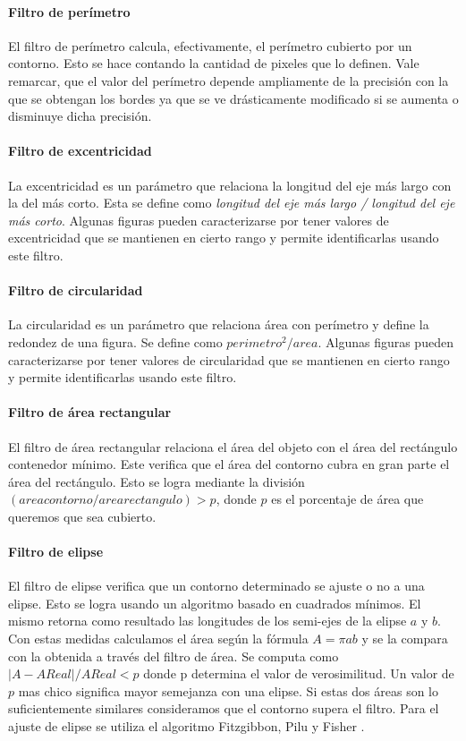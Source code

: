 	\paragraph{Filtro de per\'imetro}
	El filtro de per\'imetro calcula, efectivamente, el per\'imetro 
	cubierto por un contorno. Esto se hace contando la cantidad de pixeles que lo definen.
	Vale remarcar, que el valor del per\'imetro depende ampliamente de la precisi\'on con la que se obtengan los bordes ya que se ve dr\'asticamente modificado 
	si se aumenta o disminuye dicha precisi\'on.
	\paragraph{Filtro de excentricidad}
	La excentricidad es un par\'ametro que relaciona la longitud del eje 
	m\'as largo con la del m\'as corto. Esta se define como 
	\textit { longitud del eje m\'as largo / longitud del eje m\'as corto}. Algunas figuras pueden caracterizarse por tener valores de excentricidad
	que se mantienen en cierto rango y permite identificarlas usando este filtro.
	\paragraph{Filtro de circularidad}
	La circularidad es un par\'ametro que relaciona \'area con per\'imetro y define la redondez de una figura. Se define como $perimetro^2/area$. Algunas figuras pueden 
	caracterizarse por tener valores de circularidad que se mantienen en cierto rango y permite identificarlas usando este filtro.
	\paragraph{Filtro de \'area rectangular}
	El filtro de \'area rectangular relaciona el \'area del objeto con el \'area del rect\'angulo contenedor m\'inimo. Este verifica que el \'area
	del contorno cubra en gran parte el \'area del rect\'angulo. Esto se logra mediante la divisi\'on $(area contorno / area rectangulo)> p$, donde 
	$p$ es el porcentaje de \'area que queremos que sea cubierto.
	\paragraph{Filtro de elipse}
	El filtro de elipse verifica que un contorno determinado se ajuste o no a una elipse. Esto se logra usando un algoritmo basado 
	en cuadrados m\'inimos. El mismo retorna como resultado las longitudes de los semi-ejes de la elipse $a$ y $b$. Con estas medidas calculamos
	el \'area seg\'un la f\'ormula $A=\pi a  b$ y se la compara con la 
	obtenida a trav\'es del filtro de \'area. Se computa como $|A-AReal|/ 
	AReal < p$ donde p determina el
	valor de verosimilitud. Un valor de $p$ mas chico significa mayor 
	semejanza con una elipse. Si estas dos \'areas son lo suficientemente similares consideramos que el contorno supera el filtro. 
	Para el ajuste de elipse se utiliza el algoritmo Fitzgibbon, Pilu y Fisher \cite{Fitzgibbon99}.
